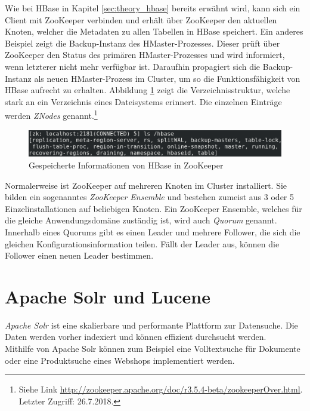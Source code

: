 \noindent
Wie bei HBase in Kapitel \ref{sec:theory_hbase} bereits erwähnt wird, kann sich ein Client mit ZooKeeper verbinden und erhält über ZooKeeper den aktuellen Knoten, welcher die Metadaten zu allen Tabellen in HBase speichert. Ein anderes Beispiel zeigt die Backup-Instanz des HMaster-Prozesses.
Dieser prüft über ZooKeeper den Status des primären HMaster-Prozesses und wird informiert, wenn letzterer nicht mehr verfügbar ist. Daraufhin propagiert sich die Backup-Instanz als neuen HMaster-Prozess im Cluster, um so die Funktionsfähigkeit von HBase aufrecht zu erhalten. Abbildung \ref{fig:zookeeper_dir} zeigt die Verzeichnisstruktur, welche stark an ein Verzeichnis eines Dateisystems erinnert. Die einzelnen Einträge werden \textit{ZNodes} genannt.\footnote{Siehe Link \url{http://zookeeper.apache.org/doc/r3.5.4-beta/zookeeperOver.html}. Letzter Zugriff: 26.7.2018.} \\

\begin{figure}[ht]
  \centering
  \includegraphics[width=\textwidth]{./resource/zookeeper_dir.png}
  \caption{Gespeicherte Informationen von HBase in ZooKeeper}
  \label{fig:zookeeper_dir}
\end{figure}


\noindent
Normalerweise ist ZooKeeper auf mehreren Knoten im Cluster installiert. Sie bilden ein sogenanntes \textit{ZooKeeper Ensemble} und bestehen zumeist aus 3 oder 5 Einzelinstallationen auf beliebigen Knoten. Ein ZooKeeper Ensemble, welches für die gleiche Anwendungsdomäne zuständig ist, wird auch \textit{Quorum} genannt. Innerhalb eines Quorums gibt es einen Leader und mehrere Follower, die sich die gleichen Konfigurationsinformation teilen. Fällt der Leader aus, können die Follower einen neuen Leader bestimmen.\cite{zookeeper_essentials}\\

\section{Apache Solr und Lucene}
\label{sec:theory_solr}
\textit{Apache Solr\texttrademark\thinspace} ist eine skalierbare und performante Plattform zur Datensuche. Die Daten werden vorher indexiert und können effizient durchsucht werden.\cite{solr_search}\\
Mithilfe von Apache Solr können zum Beispiel eine Volltextsuche für Dokumente oder eine Produktsuche eines Webshops implementiert werden.

